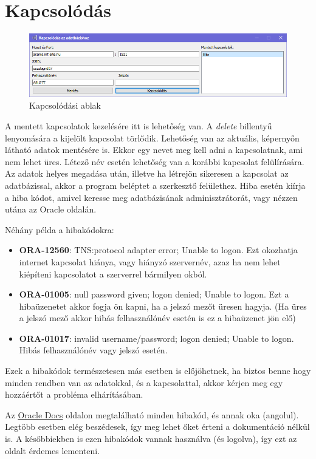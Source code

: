 \documentclass{elteikthesis}
\begin{document}
\section{Kapcsolódás}
\begin{figure}[ht]
  \includegraphics[width=1.0\textwidth]{Connect}
 \caption{Kapcsolódási ablak}
\end{figure}
A mentett kapcsolatok kezelésére itt is lehetőség van. A \textit{delete} billentyű lenyomására a kijelölt kapcsolat törlődik.
Lehetőség van az aktuális, képernyőn látható adatok mentésére is. Ekkor egy nevet meg kell adni a kapcsolatnak, ami nem lehet üres.
Létező név esetén lehetőség van a korábbi kapcsolat felülírására.
Az adatok helyes megadása után, illetve ha létrejön sikeresen a kapcsolat az adatbázissal, akkor a program beléptet a szerkesztő felülethez.
Hiba esetén kiírja a hiba kódot, amivel keresse meg adatbázisának adminisztrátorát, vagy nézzen utána az Oracle oldalán.

Néhány példa a hibakódokra:
\begin{itemize}
  \item \textbf{ORA-12560}: TNS:protocol adapter error; Unable to logon. Ezt okozhatja internet kapcsolat hiánya,
  vagy hiányzó szervernév, azaz ha nem lehet kiépíteni kapcsolatot a szerverrel bármilyen okból.
  \item \textbf{ORA-01005}: null password given; logon denied; Unable to logon. Ezt a hibaüzenetet akkor fogja ön kapni,
  ha a jelszó mezőt üresen hagyja. (Ha üres a jelszó mező akkor hibás felhasználónév esetén is ez a hibaüzenet jön elő)
  \item \textbf{ORA-01017}: invalid username/password; logon denied; Unable to logon. Hibás felhasználónév vagy jelszó esetén.
\end{itemize}

Ezek a hibakódok természetesen más esetben is előjöhetnek, ha biztos benne hogy minden rendben van az adatokkal, és a
kapcsolattal, akkor kérjen meg egy hozzáértőt a probléma elhárításában.

Az \href{https://docs.oracle.com/cd/B28359_01/server.111/b28278/toc.htm}{Oracle Docs} oldalon megtalálható minden hibakód, és annak oka (angolul).
Legtöbb esetben elég beszédesek, így meg lehet őket érteni a dokumentáció nélkül is.
A későbbiekben is ezen hibakódok vannak használva (és logolva), így ezt az oldalt érdemes lementeni.
\end{document}
